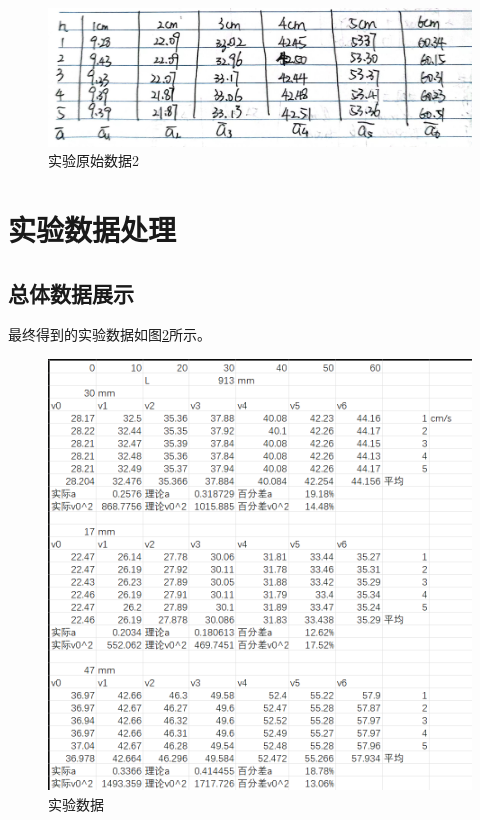 \documentclass{ctexart}
\begin{document}
\newpage
\begin{figure}[H]
  \centering
  \includegraphics[height=0.3\textheight,width=1\textwidth]{yuanshishujv2.jpg}
  \caption{实验原始数据2}\label{yuanshishujv2}
\end{figure}
\newpage

\section{实验数据处理}
  \subsection{总体数据展示}
  最终得到的实验数据如图\ref{shujv}所示。
  \begin{figure}[H]
    \centering
    \includegraphics[height=0.7\textheight,width=1\textwidth]{zongtu.png}
    \caption{实验数据}\label{shujv}
  \end{figure}  
  \newpage
\end{document}
